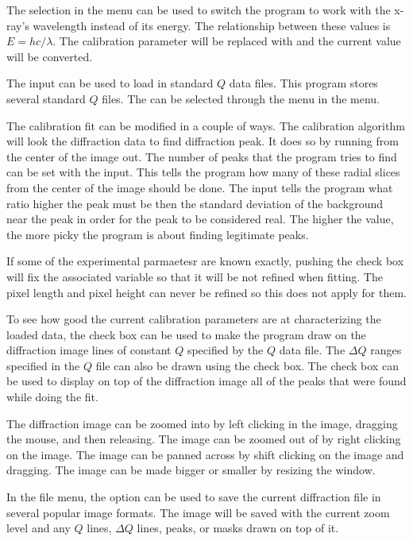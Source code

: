 The  selection in the  menu can
be used to switch the program to work with the x-ray's
wavelength instead of its energy. The relationship 
between these values is $E=hc/\lambda$. The calibration parameter 
 will be replaced with \gui{$\lambda$:} and the current 
value will be converted. 

The  input can be used to load in standard $Q$ data files. 
This program stores several standard $Q$ files. The can be selected
through the  menu in the  menu.

The calibration fit can be modified in a couple of ways.
The calibration algorithm will look 
the diffraction data to find diffraction peak. It does so by
running from the center of the image out. 
The number of peaks that the program tries to find can be
set with the  input.
This tells the program how many of these radial slices from 
the center of the image should be done. The  input 
tells the program what ratio higher the peak must be then the 
standard deviation of the background near the peak in order for the
peak to be considered real. The higher the value, the more
picky the program is about finding legitimate peaks.

If some of the experimental parmaetesr are known exactly, 
pushing the  check box will fix the associated 
variable so that it will be not refined when fitting. The pixel 
length and pixel height can never be refined so this does not
apply for them.

To see how good the current calibration parameters are at
characterizing the loaded data, the  
check box can be used to make the program draw
on the diffraction image lines of constant $Q$ specified
by the $Q$ data file. The $\Delta Q$ ranges specified in 
the $Q$ file can also be drawn using the  
check box. The  check box can be used to 
display on top of the diffraction image all of the peaks that
were found while doing the fit.

The diffraction image can be zoomed into by left clicking
in the image, dragging the mouse, and then releasing.
The image can be zoomed out of by right clicking on the image. 
The image can be panned across by shift clicking on the image 
and dragging. The image can be made bigger or smaller by 
resizing the window.

In the file menu, the  option can be used 
to save the current diffraction file in several popular
image formats. The image will be saved with the current
zoom level and any $Q$ lines, $\Delta Q$ lines, peaks, or
masks drawn on top of it.


